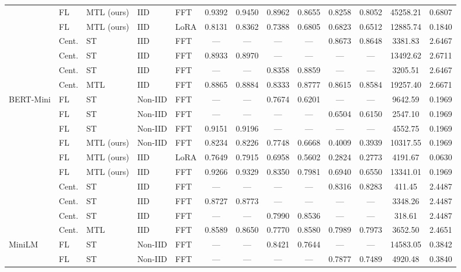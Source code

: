 \begin{table}[t]
\begin{tabular}{lllllcccccccc}
      & FL & MTL (ours) & IID & FFT & 0.9392 & 0.9450 & 0.8962 & 0.8655 & 0.8258 & 0.8052 & 45258.21 & 0.6807 \\
     & FL & MTL (ours) & IID & LoRA & 0.8131 & 0.8362 & 0.7388 & 0.6805 & 0.6823 & 0.6512 & 12885.74 & 0.1840 \\
     & Cent. & ST & IID & FFT & --- & --- & --- & --- & 0.8673 & 0.8648 & 3381.83 & 2.6467 \\
     & Cent. & ST & IID & FFT & 0.8933 & 0.8970 & --- & --- & --- & --- & 13492.62 & 2.6711 \\
     & Cent. & ST & IID & FFT & --- & --- & 0.8358 & 0.8859 & --- & --- & 3205.51 & 2.6467 \\
     & Cent. & MTL & IID & FFT & 0.8865 & 0.8884 & 0.8333 & 0.8777 & 0.8615 & 0.8584 & 19257.40 & 2.6671 \\
    \midrule
    BERT-Mini \cite{devlin2018bert} & FL & ST & Non-IID & FFT & --- & --- & 0.7674 & 0.6201 & --- & --- & 9642.59 & 0.1969 \\
     & FL & ST & Non-IID & FFT & --- & --- & --- & --- & 0.6504 & 0.6150 & 2547.10 & 0.1969 \\
     & FL & ST & Non-IID & FFT & 0.9151 & 0.9196 & --- & --- & --- & --- & 4552.75 & 0.1969 \\
      & FL & MTL (ours) & Non-IID & FFT & 0.8234 & 0.8226 & 0.7748 & 0.6668 & 0.4009 & 0.3939 & 10317.55 & 0.1969 \\
     & FL & MTL (ours) & IID & LoRA & 0.7649 & 0.7915 & 0.6958 & 0.5602 & 0.2824 & 0.2773 & 4191.67 & 0.0630 \\
      & FL & MTL (ours) & IID & FFT & 0.9266 & 0.9329 & 0.8350 & 0.7981 & 0.6940 & 0.6550 & 13341.01 & 0.1969 \\
     & Cent. & ST & IID & FFT & --- & --- & --- & --- & 0.8316 & 0.8283 & 411.45 & 2.4487 \\
     & Cent. & ST & IID & FFT & 0.8727 & 0.8773 & --- & --- & --- & --- & 3348.26 & 2.4487 \\
     & Cent. & ST & IID & FFT & --- & --- & 0.7990 & 0.8536 & --- & --- & 318.61 & 2.4487 \\
     & Cent. & MTL & IID & FFT & 0.8589 & 0.8650 & 0.7770 & 0.8580 & 0.7989 & 0.7973 & 3652.50 & 2.4651 \\
    \midrule
    MiniLM \cite{wang2020minilm} & FL & ST & Non-IID & FFT & --- & --- & 0.8421 & 0.7644 & --- & --- & 14583.05 & 0.3842 \\
     & FL & ST & Non-IID & FFT & --- & --- & --- & --- & 0.7877 & 0.7489 & 4920.48 & 0.3840 \\

\end{tabular}
\end{table}
